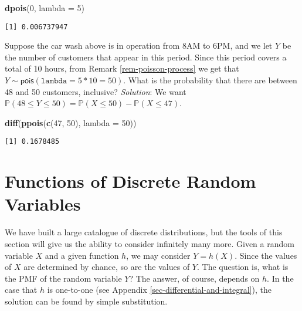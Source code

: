 \documentclass[]{book}
\newenvironment{Shaded}{\begin{snugshade}}{\end{snugshade}}
\newcommand{\KeywordTok}[1]{\textcolor[rgb]{0.13,0.29,0.53}{\textbf{{#1}}}}
\newcommand{\DataTypeTok}[1]{\textcolor[rgb]{0.13,0.29,0.53}{{#1}}}
\newcommand{\DecValTok}[1]{\textcolor[rgb]{0.00,0.00,0.81}{{#1}}}
\newcommand{\NormalTok}[1]{{#1}}
\numberwithin{equation}{chapter}
\numberwithin{figure}{chapter}
\theoremstyle{plain}
\theoremstyle{definition}
\theoremstyle{remark}
\theoremstyle{definition}
\theoremstyle{definition}
\theoremstyle{remark}
\let\BeginKnitrBlock\begin \let\EndKnitrBlock\end
\begin{document}
\begin{Shaded}
\begin{Highlighting}[]
\KeywordTok{dpois}\NormalTok{(}\DecValTok{0}\NormalTok{, }\DataTypeTok{lambda =} \DecValTok{5}\NormalTok{)}
\end{Highlighting}
\end{Shaded}

\begin{verbatim}
[1] 0.006737947
\end{verbatim}

\bigskip

\BeginKnitrBlock{example}
\protect\hypertarget{ex:unnamed-chunk-244}{}{\label{ex:unnamed-chunk-244}}Suppose
the car wash above is in operation from 8AM to 6PM, and we let \(Y\) be
the number of customers that appear in this period. Since this period
covers a total of 10 hours, from Remark \ref{rem-poisson-process} we get
that \(Y\sim\mathsf{pois}(\mathtt{lambda}=5\ast10=50)\). What is the
probability that there are between 48 and 50 customers, inclusive?
\emph{Solution}: We want
\(\mathbb{P}(48\leq Y\leq50)=\mathbb{P}(X\leq50)-\mathbb{P}(X\leq47)\).
\EndKnitrBlock{example}

\begin{Shaded}
\begin{Highlighting}[]
\KeywordTok{diff}\NormalTok{(}\KeywordTok{ppois}\NormalTok{(}\KeywordTok{c}\NormalTok{(}\DecValTok{47}\NormalTok{, }\DecValTok{50}\NormalTok{), }\DataTypeTok{lambda =} \DecValTok{50}\NormalTok{))}
\end{Highlighting}
\end{Shaded}

\begin{verbatim}
[1] 0.1678485
\end{verbatim}

\section{Functions of Discrete Random
Variables}\label{sec-functions-discrete-rvs}

We have built a large catalogue of discrete distributions, but the tools
of this section will give us the ability to consider infinitely many
more. Given a random variable \(X\) and a given function \(h\), we may
consider \(Y=h(X)\). Since the values of \(X\) are determined by chance,
so are the values of \(Y\). The question is, what is the PMF of the
random variable \(Y\)? The answer, of course, depends on \(h\). In the
case that \(h\) is one-to-one (see Appendix
\ref{sec-differential-and-integral}), the solution can be found by
simple substitution.
\end{document}
